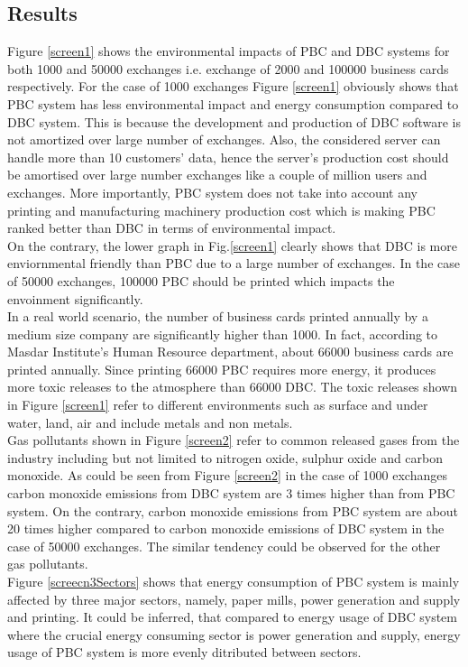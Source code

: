 \documentclass[conference]{IEEEtran}
\begin{document}
 \subsection{Results}
 Figure \ref{screen1} shows the environmental impacts of PBC and DBC systems for both 1000 and 50000 exchanges i.e. exchange of 2000 and 100000 business cards respectively. For the case of 1000 exchanges Figure \ref{screen1} obviously shows that PBC system has less environmental impact and energy consumption compared to DBC system. This is because the development and production of DBC software is not amortized over large number of exchanges. Also, the considered server can handle more than 10 customers' data, hence the server's production cost should be amortised over large number exchanges like a couple of million users and exchanges. More importantly, PBC system does not take into account any printing and manufacturing machinery production cost which is making PBC ranked better than DBC in terms of environmental impact.\\
On the contrary, the lower graph in Fig.\ref{screen1} clearly shows that DBC is more enviornmental friendly than PBC due to a large number of exchanges. In the case of 50000 exchanges, 100000 PBC should be printed which impacts the envoinment significantly.\\
In a real world scenario, the number of business cards printed annually by a medium size company are significantly higher than 1000. In fact, according to Masdar Institute's Human Resource department, about  66000 business cards are printed annually. Since printing 66000 PBC requires more energy, it produces more toxic releases to the atmosphere than 66000 DBC. The toxic releases shown in Figure \ref{screen1} refer to different environments such as surface and under water, land, air and include metals and non metals.\\
Gas pollutants shown in Figure \ref{screen2} refer to common released gases from the industry including but not limited to nitrogen oxide, sulphur oxide and carbon monoxide. As could be seen from Figure \ref{screen2} in the case of 1000 exchanges  carbon monoxide emissions from DBC system are 3 times higher than from PBC system. On the contrary, carbon monoxide emissions from PBC system are about 20 times higher compared to carbon monoxide emissions of DBC system in the case of 50000 exchanges. The similar tendency could be observed for the other gas pollutants.\\
Figure \ref{screecn3Sectors} shows that energy consumption of PBC system is mainly affected by three major sectors, namely, paper mills, power generation and supply and printing. It could be inferred, that compared to energy usage of DBC system where the crucial energy consuming sector is power generation and supply, energy usage of PBC system is more evenly ditributed between sectors. 
\end{document}
